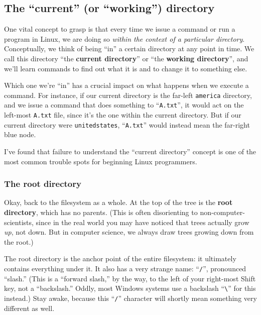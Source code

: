\subsection{The ``current'' (or ``working'') directory}

One vital concept to grasp is that every time we issue a command or run a
program in Linux, we are doing so \textit{within the context of a particular
directory}. Conceptually, we think of being ``in'' a certain directory at any
point in time. We call this directory ``the \textbf{current directory}'' or
``the \textbf{working directory}'', and we'll learn commands to find out what
it is and to change it to something else.

Which one we're ``in'' has a crucial impact on what happens when we execute a
command. For instance, if our current directory is the far-left
\texttt{america} directory, and we issue a command that does something to
``\texttt{A.txt}'', it would act on the left-most \texttt{A.txt} file, since
it's the one within the current directory. But if our current directory were
\texttt{unitedstates}, ``\texttt{A.txt}'' would instead mean the far-right blue
node.

I've found that failure to understand the ``current directory'' concept is one
of the most common trouble spots for beginning Linux programmers.

\subsubsection{The root directory}


Okay, back to the filesystem as a whole. At the top of the tree is the
\textbf{root directory}, which has no parents. (This is often disorienting to
non-computer-scientists, since in the real world you may have noticed that
trees actually grow \textit{up}, not down. But in computer science, we always
draw trees growing down from the root.)

The root directory is the anchor point of the entire filesystem: it ultimately
contains everything under it. It also has a very strange name: ``\texttt{/}'',
pronounced ``slash.'' (This is a ``forward slash,'' by the way, to the left of
your right-most Shift key, not a ``backslash.'' Oddly, most Windows systems
use a backslash ``\texttt{\textbackslash}'' for this instead.) Stay awake,
because this ``\texttt{/}'' character will shortly mean something very
different as well.

